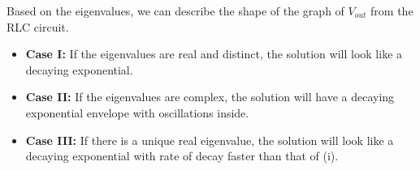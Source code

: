 \begin{enumerate}
    \ws {
        \vspace{100px}
    }

    \end{enumerate}

Based on the eigenvalues, we can describe the shape of the graph of $V_{out}$ from the RLC circuit.
\begin{itemize}
\item \textbf{Case I:} If the eigenvalues are real and distinct, the solution will look like a decaying exponential.
\item \textbf{Case II:} If the eigenvalues are complex, the solution will have a decaying exponential envelope with oscillations inside.
\item \textbf{Case III:} If there is a unique real eigenvalue, the solution will look like a decaying exponential with rate of decay faster than that of (i).
\end{itemize}



	 
